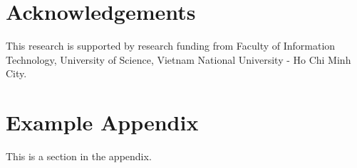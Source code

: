 \documentclass[11pt]{article}
\begin{document}
\section*{Acknowledgements}
This research is supported by research funding from Faculty of Information Technology, University of Science, Vietnam National University - Ho Chi Minh City.




\appendix

\section{Example Appendix}
\label{sec:appendix}

This is a section in the appendix.
\end{document}
